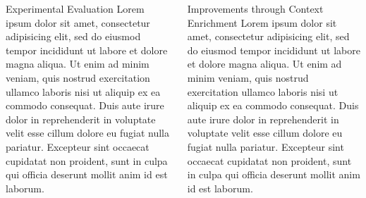 \documentclass[final,hyperref={pdfpagelabels=true}]{beamer}
\begin{document}
\begin{frame}
\begin{columns}[t, onlytextwidth]
\begin{column}{\textwidth}
		
		\begin{columns}[t, onlytextwidth]
			\begin{column}{.49\linewidth}
				\begin{block}{Experimental Evaluation}
					    Lorem ipsum dolor sit amet, consectetur adipisicing elit, sed do eiusmod tempor incididunt ut labore et dolore magna aliqua. Ut enim ad minim veniam, quis nostrud exercitation ullamco laboris nisi ut aliquip ex ea commodo consequat. Duis aute irure dolor in reprehenderit in voluptate velit esse cillum dolore eu fugiat nulla pariatur. Excepteur sint occaecat cupidatat non proident, sunt in culpa qui officia deserunt mollit anim id est laborum.
				\end{block}
			\end{column}
			\begin{column}{.49\linewidth}
				\begin{block}{Improvements through Context Enrichment}
					    Lorem ipsum dolor sit amet, consectetur adipisicing elit, sed do eiusmod tempor incididunt ut labore et dolore magna aliqua. Ut enim ad minim veniam, quis nostrud exercitation ullamco laboris nisi ut aliquip ex ea commodo consequat. Duis aute irure dolor in reprehenderit in voluptate velit esse cillum dolore eu fugiat nulla pariatur. Excepteur sint occaecat cupidatat non proident, sunt in culpa qui officia deserunt mollit anim id est laborum.
				\end{block}
			\end{column}
		\end{columns}
		
    \end{column}

  \end{columns}
\end{frame}
\end{document}

